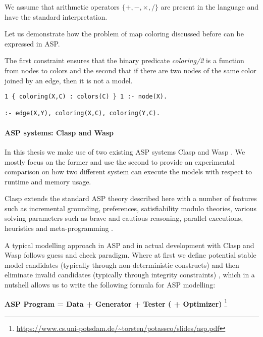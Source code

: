 We assume that arithmetic operators $\{ +, -, \times, / \}$ are present in the language and have the standard interpretation.

\begin{example}
  Let us demonstrate how the problem of map coloring discussed before can be expressed in ASP. 

  The first constraint ensures that the binary predicate \textit{coloring/2} is a function from nodes to colors and the second that if there are two nodes of the same color joined by an edge, then it is not a model.
\begin{lstlisting}[caption=ASP encoding of map coloring constraints, label=lst:example_asp_coloring,basicstyle=\ttfamily]
1 { coloring(X,C) : colors(C) } 1 :- node(X).

:- edge(X,Y), coloring(X,C), coloring(Y,C).
\end{lstlisting}
\end{example}

\paragraph{ASP systems: Clasp and Wasp}
In this thesis we make use of two existing ASP systems Clasp \parencite{clasp} and Wasp \parencite{wasp}. We mostly focus on the former and use the second to provide an experimental comparison on how two different system can execute the models with respect to runtime and memory usage.

Clasp extends the standard ASP theory described here with a number of features such as incremental grounding, preferences, satisfiability modulo theories, various solving parameters such as brave and cautious reasoning, parallel executions, heuristics and meta-programming \parencite{ASPbook}.

A typical modelling approach in ASP and in actual development with Clasp and Wasp follows guess and check paradigm. Where at first we define potential stable model candidates 
(typically through non-deterministic constructs) and then eliminate invalid candidates (typically through integrity constraints) \parencite{clasp, ASPbook, whatisasp}, which in a nutshell allows us to write the following formula for ASP modelling:

\begin{center}
    {\bfseries ASP Program = Data + Generator + Tester ( + Optimizer)} \footnote{\url{https://www.cs.uni-potsdam.de/~torsten/potassco/slides/asp.pdf}}
\end{center}

